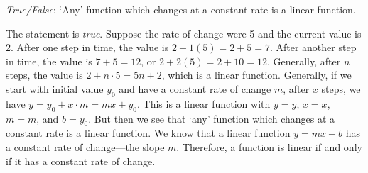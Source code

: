 \documentclass[11pt,letterpaper]{article}
\begin{document}
\quizsol \textit{True/False}: `Any' function which changes at a constant rate is a linear function. \pspace

\sol The statement is \textit{true}. Suppose the rate of change were 5 and the current value is 2. After one step in time, the value is $2 + 1(5)= 2 + 5= 7$. After another step in time, the value is $7 + 5= 12$, or $2 + 2(5)= 2 + 10= 12$. Generally, after $n$ steps, the value is $2 + n \cdot 5= 5n + 2$, which is a linear function. Generally, if we start with initial value $y_0$ and have a constant rate of change $m$, after $x$ steps, we have $y= y_0 + x \cdot m= mx + y_0$. This is a linear function with $y= y$, $x= x$, $m= m$, and $b= y_0$. But then we see that `any' function which changes at a constant rate is a linear function. We know that a linear function $y= mx + b$ has a constant rate of change---the slope $m$. Therefore, a function is linear if and only if it has a constant rate of change. 
\end{document}
